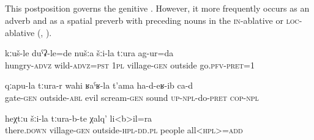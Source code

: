 
\subsection{ }
\label{ssec:postposition tura}

This postposition governs the genitive . However, it more frequently occurs as an adverb and as a spatial preverb with preceding nouns in the \textsc{in}-ablative or \textsc{loc}-ablative (, ).
%
\begin{exe}
	\ex
	\begin{xlist}
		\ex	\label{Hungry and wild, we went out of the village}
		\gll	kːuš-le	duˁʡ-le=de	nušːa	šːi-la	tːura	ag-ur=da  \\
			hungry-\textsc{advz}	wild-\textsc{advz}=\textsc{pst}	\textsc{1pl}	village-\textsc{gen}	outside	go.\textsc{pfv}-\textsc{pret}=1\\
		\glt	{}

		\ex	\label{From outside the gates an evil scream was made}
		\gll	qːapu-la	tːura-r	wahi	ʁaˁʁ-la	t'ama	ha-d-eʁ-ib ca-d\\
			gate-\textsc{gen}	outside-\textsc{abl}	evil	scream-\textsc{gen}	sound	\textsc{up}-\textsc{npl}-do-\textsc{pret} \textsc{cop-npl}\\
		\glt	{}

		\ex	\label{also all people outside of the villag}
		\gll	heχtːu	šːi-la	tːura-b-te	χalq'	li<b>il=ra\\
			there.\textsc{down}	village-\textsc{gen}	outside-\textsc{hpl}-\textsc{dd.pl} 	people	all<\textsc{hpl}>=\textsc{add}\\
		\glt	{}
	\end{xlist}
\end{exe}

